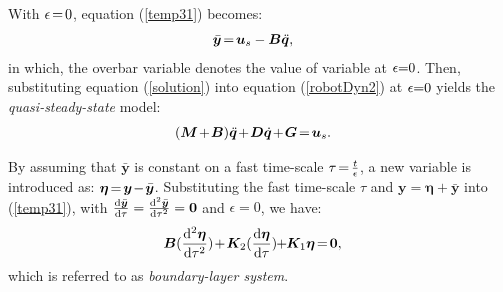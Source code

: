 \documentclass[letterpaper, 10 pt, conference]{ieeeconf}
\begin{document}
With
$\epsilon\hspace{-0.05cm}=\hspace{-0.05cm}0$, equation
(\ref{temp31}) becomes:
\begin{eqnarray}
&\bar{\bm y}\hspace{-0.05cm}=\hspace{-0.05cm}{\bm u}_s-\bm
B\ddot{{\bm q}},\label{solution}
\end{eqnarray}
in which, the overbar variable denotes the value of variable at
$\epsilon\hspace{-0.1cm}=\hspace{-0.1cm}0$. Then, substituting
equation (\ref{solution}) into equation (\ref{robotDyn2}) at
$\epsilon\hspace{-0.1cm}=\hspace{-0.1cm}0$ yields the {\em
quasi-steady-state} model:
\begin{eqnarray}
&(\bm M\hspace{-0.05cm}+\hspace{-0.05cm}\bm B)\ddot{{{\bm
q}}}\hspace{-0.05cm}+\hspace{-0.05cm}\bm D\dot{{\bm q}}\hspace{-0.05cm}+\hspace{-0.05cm}\bm G\hspace{-0.05cm}=\hspace{-0.05cm}{\bm
u}_s.\label{quasi}
\end{eqnarray}

By assuming that $\bar{\bm y}$ is constant on a fast time-scale
$\tau\hspace{-0.05cm}=\hspace{-0.05cm}\frac{t}{\epsilon}$, a new
variable is introduced as:
$\bm\eta\hspace{-0.05cm}=\hspace{-0.05cm}\bm
y\hspace{-0.05cm}-\hspace{-0.05cm}\bar{\bm y}$. Substituting the
fast time-scale $\tau$ and $\bm y=\bm\eta+\bar{\bm y}$ into
(\ref{temp31}), with $\frac{{\rm d}\bar{\bm y}}{{\rm
d}\tau}=\frac{{\rm d}^2\bar{\bm y}}{{\rm d}\tau^2}=\bm 0$ and
$\epsilon=0$, we have:
\begin{eqnarray}
&\bm B(\frac{{\rm d}^2\bm\eta}{{\rm
d}\tau^2})\hspace{-0.05cm}+\hspace{-0.05cm}\bm K_2(\frac{{\rm
d}\bm\eta}{{\rm d}\tau})\hspace{-0.1cm}+\hspace{-0.1cm}\bm
K_1\bm\eta\hspace{-0.05cm}=\hspace{-0.05cm}\bm 0,\label{boundary}
\end{eqnarray}
which is referred to as {\em boundary-layer system}.
\end{document}
